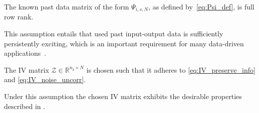 \begin{assum}\label{assum:PE}
    The known past data matrix of the form $\Psi_{i,s,N}$, as defined by~\eqref{eq:Psi_def}, is full row rank.
\end{assum}
This assumption entails that used past input-output data is sufficiently persistently exciting, which is an important requirement for many data-driven applications~\citep{vanWaarde2023}.

\begin{assum}\label{assum:IV_def}
    The \acs{IV} matrix $\mathcal{Z}\in\mathbb{R}^{n_\mathrm{z}\times N}$ is chosen such that it adheres to \eqref{eq:IV_preserve_info} and \eqref{eq:IV_noise_uncorr}.
\end{assum}
Under this assumption the chosen \acs{IV} matrix exhibits the desirable properties described in .

